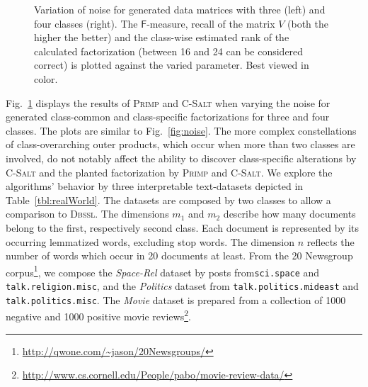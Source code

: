 \begin{figure}[!t]
\centering

\caption{Variation of noise for generated data matrices with three (left) and four classes (right). The $\mathsf{F}$-measure, recall of the matrix $V$ (both the higher the better) and the class-wise estimated rank of the calculated factorization (between 16 and 24 can be considered correct) is plotted against the varied parameter. Best viewed in color.}
\label{fig:synthClass}
\end{figure}
Fig.~\ref{fig:synthClass} displays the results of \textsc{Primp} and \textsc{C-Salt} when varying the noise for generated class-common and class-specific factorizations for three and four classes. The plots are similar to Fig.~\ref{fig:noise}. The more complex constellations of class-overarching outer products, which occur when more than two classes are involved, do not notably affect the ability to discover class-specific alterations by \textsc{C-Salt} and the planted factorization by \textsc{Primp} and \textsc{C-Salt}.
We explore the algorithms' behavior by three interpretable text-datasets depicted in Table~\ref{tbl:realWorld}. The datasets are composed by two classes to allow a comparison to \textsc{Dbssl}. The dimensions $m_1$ and $m_2$ describe how many documents belong to the first, respectively second class. Each document is represented by its occurring lemmatized words, excluding stop words. The dimension $n$ reflects the number of words which occur in 20 documents at least.
From the 20 Newsgroup corpus\footnote{\url{http://qwone.com/~jason/20Newsgroups/}}, we compose the \emph{Space-Rel} dataset by posts from\texttt{sci.space} and \texttt{talk.religion.misc}, and the \emph{Politics} dataset from \texttt{talk.politics.mideast} and \texttt{talk.politics.misc}. The \emph{Movie} dataset is prepared from a collection of 1000 negative and 1000 positive movie reviews\footnote{\url{http://www.cs.cornell.edu/People/pabo/movie-review-data/}}.

